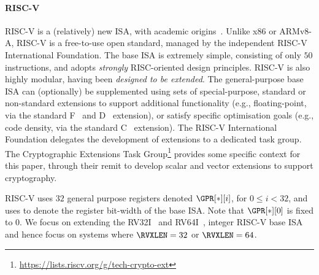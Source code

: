 
\paragraph{RISC-V}
\label{sec:bg:riscv}

RISC-V is a (relatively) new ISA, with academic origins~\cite{riscv:1,riscv:2}.
Unlike x86 or ARMv8-A, RISC-V is a free-to-use 
open standard, managed by the independent RISC-V International Foundation.
The base ISA is extremely simple, consisting of only $50$ instructions,
and adopts {\em strongly} RISC-oriented design principles.
RISC-V is also highly modular, having been {\em designed to be extended}.
The general-purpose base ISA can (optionally) be
supplemented using sets of special-purpose, standard or non-standard
extensions to
support additional functionality 
(e.g., floating-point, 
       via the 
       standard F~\cite[Section 11]{RV:ISA:I:19}
                and
                D~\cite[Section 12]{RV:ISA:I:19}
       extension),
or 
satisfy specific optimisation goals
(e.g., code density, 
       via the 
       standard C~\cite[Section 16]{RV:ISA:I:19}
       extension).
The RISC-V International Foundation delegates the development of
extensions to a dedicated task group.
The Cryptographic Extensions Task
Group\footnote{
  \url{https://lists.riscv.org/g/tech-crypto-ext}
} provides some specific context for this paper, through their remit to 
develop scalar and vector extensions to support cryptography.

RISC-V uses $32$ general purpose registers
denoted $\GPR[*][ i ]$, for $0 \leq i < 32$,
and uses \RVXLEN to denote the register bit-width of the base ISA.
Note that 
$
\GPR[*][ 0 ]
$
is fixed to $0$.
We focus on extending the
RV32I~\cite[Section 2]{RV:ISA:I:19}
and 
RV64I~\cite[Section 5]{RV:ISA:I:19},
integer RISC-V base ISA
and hence focus on systems where 
$\RVXLEN = 32$
or
$\RVXLEN = 64$.

